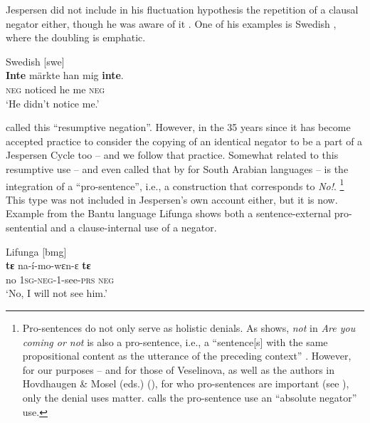 ﻿\documentclass[output=paper,draft,draftmode,colorlinks,citecolor=brown]{langscibook}
\begin{document}
Jespersen did not
include in his fluctuation hypothesis the repetition of a clausal negator
either, though he was aware of it \parencite[72--73]{Jespersen1917}.
One of his examples is Swedish ,
where the doubling is emphatic.
%
\begin{exe}\ex\label{ex:int-swedish-notice}
    Swedish [swe]   \\
    \gll \textbf{Inte}   märkte  han   mig   \textbf{inte}.  \\
  \textsc{neg}  noticed  he  me  \textsc{neg} \\
    \glt `He didn't notice me.'
    \end{exe}
%
\textcite[72]{Jespersen1917} called this ``resumptive negation''. However, in
the 35 years since \textcite{Dahl1979} it has become accepted practice to
consider the copying of an identical negator to be a part of a Jespersen
Cycle too -- and we follow that practice. Somewhat related to this
resumptive use -- and even called that by
\textcites[359]{Sjors2015}[399]{Sjors2018} for
South Arabian languages -- is the integration of a ``pro-sentence'', i.e., a
construction that corresponds to \textit{No!}.%
%
\footnote{Pro-sentences do
not only serve as holistic denials. As \textcite[111]{Veselinova2013} shows,
\textit{not} in \textit{Are you coming or
not} is also a pro-sentence, i.e., a ``sentence[s] with the same
propositional content as the utterance of the preceding context''
\parencite[89]{BerniniRamat1996}. However, for our purposes -- and for those
of Veselinova, as well as the authors in Hovdhaugen \& Mosel (eds.)
(\citeyear{HovdhaugenMosel1999}), for who pro-sentences are important (see
), only the
denial uses matter. \textcite[30]{Schwegler1988} calls the pro-sentence use an
``absolute negator'' use.} %
%
This type was not included in Jespersen's own
account either, but it is now. Example  from the
Bantu language Lifunga shows both a sentence-external
pro-sentential and a clause-internal use of a negator.
%
\begin{exe}\ex\label{ex:int-lifunga-see}
Lifunga [bmg]
\\
    \gll \textbf{tɛ}  na-í-mo-wɛn-ɛ   \textbf{tɛ}\\
  no  \textsc{1sg-neg}-1-see-\textsc{prs}   \textsc{neg} \\
    \glt `No, I will not see him.'
    \end{exe}
\end{document}
